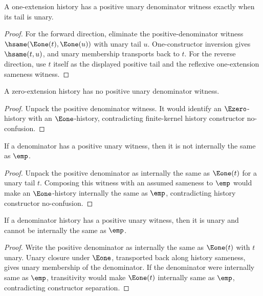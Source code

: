 \begin{theorem}
\label{thm:rat-positive-unary-denominator-eone-iff-unary}
A one-extension history has a positive unary denominator witness exactly when
its tail is unary.
\end{theorem}
\begin{proof}
For the forward direction, eliminate the positive-denominator witness
$\hsame(\Eone(t),\Eone(u))$ with unary tail $u$. One-constructor inversion
gives $\hsame(t,u)$, and unary membership transports back to $t$. For the
reverse direction, use $t$ itself as the displayed positive tail and the
reflexive one-extension sameness witness.
\end{proof}

\begin{theorem}
\label{thm:rat-positive-denominator-e0-absurd}
A zero-extension history has no positive unary denominator witness.
\end{theorem}
\begin{proof}
Unpack the positive denominator witness. It would identify an
$\Ezero$-history with an $\Eone$-history, contradicting finite-kernel
history constructor no-confusion.
\end{proof}

\begin{theorem}
\label{thm:rat-positive-unary-denominator-not-empty}
If a denominator has a positive unary witness, then it is not internally the
same as $\emp$.
\end{theorem}
\begin{proof}
Unpack the positive denominator as internally the same as $\Eone(t)$ for a
unary tail $t$. Composing this witness with an assumed sameness to $\emp$
would make an $\Eone$-history internally the same as $\emp$, contradicting
history constructor no-confusion.
\end{proof}

\begin{theorem}
\label{thm:positive-unary-denominator-unary-and-nonempty}
If a denominator history has a positive unary witness, then it is unary and cannot be internally the same as $\emp$.
\end{theorem}
\begin{proof}
Write the positive denominator as internally the same as $\Eone(t)$ with $t$ unary. Unary closure under $\Eone$, transported back along history sameness, gives unary membership of the denominator. If the denominator were internally same as $\emp$, transitivity would make $\Eone(t)$ internally same as $\emp$, contradicting constructor separation.
\end{proof}

